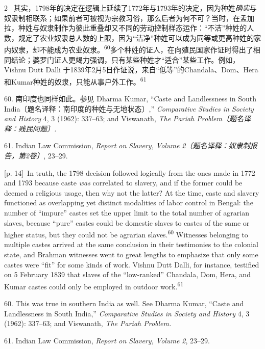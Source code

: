 \documentclass[10pt,a4paper]{article}
\begin{document}
\begin{paracol}{2}
\switchcolumn*
{\scriptsize\color{gray} [p. 14]}\ 其实，1798年的决定在逻辑上延续了1772年与1793年的决定，因为种姓\textit{确实}与奴隶制相联系；如果前者可被视为宗教习俗，那么后者为何不可？当时，在孟加拉，种姓与奴隶制作为彼此重叠却又不同的劳动控制样态运作：“不洁”种姓的人数，规定了农业奴隶总人数的上限，因为“洁净”种姓可以成为同等或更高种姓的家内奴隶，却不能成为农业奴\mbox{隶。\textsuperscript{60}}多个种姓的证人，在向殖民国家作证时得出了相同结论；婆罗门证人更竭力强调，只有某些种姓才“适合”某些工作。例如，Vishnu Dutt Dalli 于1839年2月5日作证说，来自“低等”的Chandala、Dom、Hera和Kumar种姓的奴隶，只能从事户外工\mbox{作。\textsuperscript{61}}\par{\small 60. 南印度也同样如此。参见 Dharma Kumar, “Caste and Landlessness in South India〔题名译释：南印度的种姓与无地状态〕,” \textit{Comparative Studies in Society and History} 4, 3 (1962): 337–63; and Viswanath, \textit{The Pariah Problem〔题名译释：贱民问题〕.}\par}{\small 61. Indian Law Commission, \textit{Report on Slavery, Volume 2〔题名译释：奴隶制报告，第2卷〕}, 23–29.\par}
\switchcolumn
{\scriptsize\color{gray} [p. 14]}\ In truth, the 1798 decision followed logically from the ones made in 1772 and 1793 because caste \textit{was} correlated to slavery, and if the former could be deemed a religious usage, then why not the latter? At the time, caste and slavery functioned as overlapping yet distinct modalities of labor control in Bengal: the number of “impure” castes set the upper limit to the total number of agrarian slaves, because “pure” castes could be domestic slaves to castes of the same or higher status, but they could not be agrarian slaves.\nobreak\textsuperscript{60} Witnesses belonging to multiple castes arrived at the same conclusion in their testimonies to the colonial state, and Brahman witnesses went to great lengths to emphasize that only some castes were “fit” for some kinds of work. Vishnu Dutt Dalli, for instance, testified on 5 February 1839 that slaves of the “low-ranked” Chandala, Dom, Hera, and Kumar castes could only be employed in outdoor work.\nobreak\textsuperscript{61}\par{\small 60. This was true in southern India as well. See Dharma Kumar, “Caste and Landlessness in South India,” \textit{Comparative Studies in Society and History} 4, 3 (1962): 337–63; and Viswanath, \textit{The Pariah Problem.}\par}{\small 61. Indian Law Commission, \textit{Report on Slavery, Volume 2}, 23–29.\par}

\end{paracol}
\end{document}
